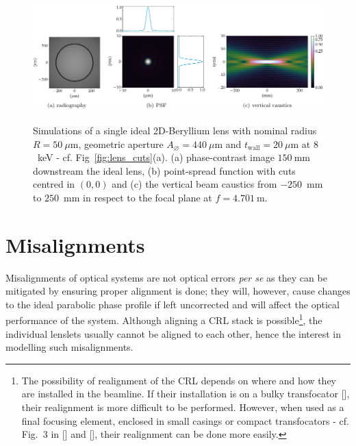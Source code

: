\begin{refsection}
 \begin{figure}[!htb]
        \centering
        {\includegraphics[height=4.19cm]{figures/ch04/CRL_ideal.pdf}}
        \caption[The ideal single X-ray lens]{Simulations of a single ideal 2D-Beryllium lens with nominal radius $R=50~\mu\text{m}$, geometric aperture $A_{\diameter}=440~\mu\text{m}$ and $t_\text{wall}=20~\mu$m at $8$~keV  - cf. Fig~\ref{fig:lens_cuts}(a). (a) phase-contrast image $150~$mm downstream the ideal lens, (b) point-spread function with cuts centred in $(0,0)$ and (c) the vertical beam caustics from $-250$~mm to $250$~mm in respect to the focal plane at $f=4.701~$m.} \label{fig:ideal_CRL}
\end{figure}

\clearpage

\section{Misalignments}\label{sec:misalignments}

Misalignments of optical systems are not optical errors \textit{per se} as they can be mitigated by ensuring proper alignment is done; they will, however, cause changes to the ideal parabolic phase profile if left uncorrected and will affect the optical performance of the system. Although aligning a CRL stack is possible\footnote{The possibility of realignment of the CRL depends on where and how they are installed in the beamline. If their installation is on a bulky transfocator [\cite{Vaughan2011}], their realignment is more difficult to be performed. However, when used as a final focusing element, enclosed in small casings or compact transfocators - cf. Fig.~3 in [\cite{Lengeler1999}] and [\cite{Kornemann2017, Narikovich2019}], their realignment can be done more easily.}, the individual lenslets usually cannot be aligned to each other, hence the interest in modelling such misalignments.


\end{refsection}
